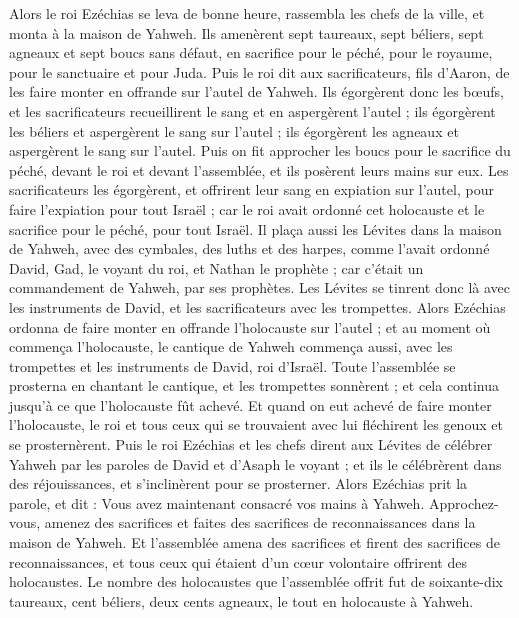 \begin{multicols}{2}
Alors le roi Ezéchias se leva de bonne heure, rassembla les chefs de la ville, et monta à la maison de Yahweh.
Ils amenèrent sept taureaux, sept béliers, sept agneaux et sept boucs sans défaut, en sacrifice pour le péché, pour le royaume, pour le sanctuaire et pour Juda. Puis le roi dit aux sacrificateurs, fils d'Aaron, de les faire monter en offrande sur l'autel de Yahweh.
Ils égorgèrent donc les bœufs, et les sacrificateurs recueillirent le sang et en aspergèrent l'autel ; ils égorgèrent les béliers et aspergèrent le sang sur l'autel ; ils égorgèrent les agneaux et aspergèrent le sang sur l'autel.
Puis on fit approcher les boucs pour le sacrifice du péché, devant le roi et devant l'assemblée, et ils posèrent leurs mains sur eux.
Les sacrificateurs les égorgèrent, et offrirent leur sang en expiation sur l'autel, pour faire l'expiation pour tout Israël ; car le roi avait ordonné cet holocauste et le sacrifice pour le péché, pour tout Israël.
Il plaça aussi les Lévites dans la maison de Yahweh, avec des cymbales, des luths et des harpes, comme l’avait ordonné David, Gad, le voyant du roi, et Nathan le prophète ; car c'était un commandement de Yahweh, par ses prophètes.
Les Lévites se tinrent donc là avec les instruments de David, et les sacrificateurs avec les trompettes.
Alors Ezéchias ordonna de faire monter en offrande l'holocauste sur l'autel ; et au moment où commença l'holocauste, le cantique de Yahweh commença aussi, avec les trompettes et les instruments de David, roi d'Israël.
Toute l'assemblée se prosterna en chantant le cantique, et les trompettes sonnèrent ; et cela continua jusqu'à ce que l'holocauste fût achevé.
Et quand on eut achevé de faire monter l'holocauste, le roi et tous ceux qui se trouvaient avec lui fléchirent les genoux et se prosternèrent.
Puis le roi Ezéchias et les chefs dirent aux Lévites de célébrer Yahweh par les paroles de David et d'Asaph le voyant ; et ils le célébrèrent dans des réjouissances, et s'inclinèrent pour se prosterner.
Alors Ezéchias prit la parole, et dit : Vous avez maintenant consacré vos mains à Yahweh. Approchez-vous, amenez des sacrifices et faites des sacrifices de reconnaissances dans la maison de Yahweh. Et l'assemblée amena des sacrifices et firent des sacrifices de reconnaissances, et tous ceux qui étaient d'un cœur volontaire offrirent des holocaustes.
Le nombre des holocaustes que l'assemblée offrit fut de soixante-dix taureaux, cent béliers, deux cents agneaux, le tout en holocauste à Yahweh.

\end{multicols}
